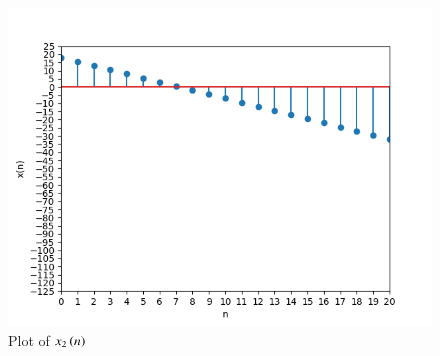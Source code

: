 \documentclass[journal,12pt,twocolumn]{IEEEtran}
\theoremstyle{remark}
\begin{document}
\begin{enumerate}
\begin{figure}[!ht]
\centering
\begin{center}
\includegraphics[width=\columnwidth]{Figure_2}
\caption{Plot of $x_2\left(n\right)$}
\end{center}
\end{figure}

\end{enumerate}
\end{document}
